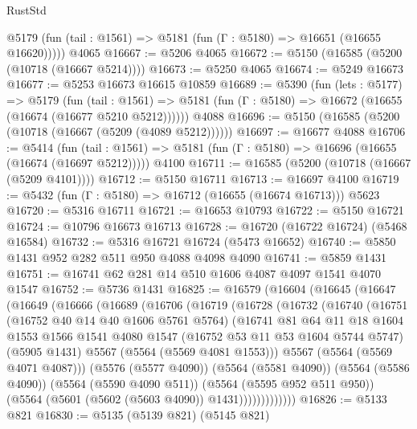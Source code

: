 \begin{lexlean}{RustStd}
\begin{coremodule}
      @5179 (fun (tail : @1561) => @5181 (fun (Γ : @5180) => @16651 (@16655 @16620)))))
    @4065
@16667 := @5206 @4065
@16672 := @5150 (@16585 (@5200 (@10718 (@16667 @5214))))
@16673 := @5250 @4065
@16674 := @5249 @16673
@16677 := @5253 @16673 @16615 @10859
@16689 := @5390
    (fun (lets : @5177) =>
    @5179
      (fun (tail : @1561) =>
      @5181 (fun (Γ : @5180) => @16672 (@16655 (@16674 (@16677 @5210 @5212))))))
    @4088
@16696 := @5150 (@16585 (@5200 (@10718 (@16667 (@5209 (@4089 @5212))))))
@16697 := @16677 @4088
@16706 := @5414
    (fun (tail : @1561) => @5181 (fun (Γ : @5180) => @16696 (@16655 (@16674 (@16697 @5212)))))
    @4100
@16711 := @16585 (@5200 (@10718 (@16667 (@5209 @4101))))
@16712 := @5150 @16711
@16713 := @16697 @4100
@16719 := @5432 (fun (Γ : @5180) => @16712 (@16655 (@16674 @16713))) @5623
@16720 := @5316 @16711
@16721 := @16653 @10793
@16722 := @5150 @16721
@16724 := @10796 @16673 @16713
@16728 := @16720 (@16722 @16724) (@5468 @16584)
@16732 := @5316 @16721 @16724 (@5473 @16652)
@16740 := @5850 @1431 @952 @282 @511 @950 @4088 @4098 @4090
@16741 := @5859 @1431
@16751 := @16741 @62 @281 @14 @510 @1606 @4087 @4097 @1541 @4070 @1547
@16752 := @5736 @1431
@16825 := @16579
    (@16604
      (@16645
        (@16647
          (@16649
            (@16666
              (@16689
                (@16706
                  (@16719
                    (@16728
                      (@16732
                        (@16740
                          (@16751
                            (@16752 @40 @14 @40 @1606 @5761 @5764)
                            (@16741
                              @81
                              @64
                              @11
                              @18
                              @1604
                              @1553
                              @1566
                              @1541
                              @4080
                              @1547
                              (@16752 @53 @11 @53 @1604 @5744 @5747)
                              (@5905 @1431)
                              @5567
                              (@5564 (@5569 @4081 @1553)))
                            @5567
                            (@5564 (@5569 @4071 @4087)))
                          (@5576 (@5577 @4090))
                          (@5564 (@5581 @4090))
                          (@5564 (@5586 @4090))
                          (@5564 (@5590 @4090 @511))
                          (@5564 (@5595 @952 @511 @950))
                          (@5564 (@5601 (@5602 (@5603 @4090)) @1431)))))))))))))
@16826 := @5133 @821
@16830 := @5135 (@5139 @821) (@5145 @821)

\end{coremodule}
\end{lexlean}
